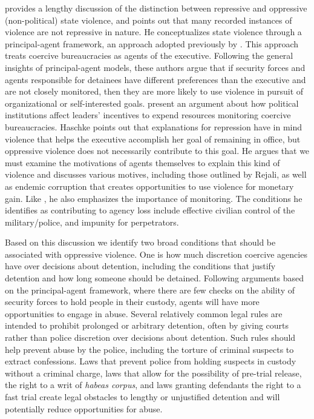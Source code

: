 \documentclass[11pt]{article}
\begin{document}
\citet{Haschke2018} provides a lengthy discussion of the distinction between repressive and oppressive (non-political) state violence, and points out that many recorded instances of violence are not repressive in nature. He conceptualizes state violence through a principal-agent framework, an approach adopted previously by \citet{ConradMoore2010}. This approach treats coercive bureaucracies as agents of the executive. Following the general insights of principal-agent models, these authors argue that if security forces and agents responsible for detainees have different preferences than the executive and are not closely monitored, then they are more likely to use violence in pursuit of organizational or self-interested goals. \citet{ConradMoore2010} present an argument about how political institutions affect leaders' incentives to expend resources monitoring coercive bureaucracies. Haschke points out that explanations for repression have in mind violence that helps the executive accomplish her goal of remaining in office, but oppressive violence does not necessarily contribute to this goal. He argues that we must examine the motivations of agents themselves to explain this kind of violence and discusses various motives, including those outlined by Rejali, as well as endemic corruption that creates opportunities to use violence for monetary gain. Like \citet{ConradMoore2010}, he also emphasizes the importance of monitoring. The conditions he identifies as contributing to agency loss include effective civilian control of the military/police, and impunity for perpetrators. 

Based on this discussion we identify two broad conditions that should be associated with oppressive violence. One is how much discretion coercive agencies have over decisions about detention, including the conditions that justify detention and how long someone should be detained. Following arguments based on the principal-agent framework, where there are few checks on the ability of security forces to hold people in their custody, agents will have more opportunities to engage in abuse. Several relatively common legal rules are intended to prohibit prolonged or arbitrary detention, often by giving courts rather than police discretion over decisions about detention. Such rules should help prevent abuse by the police, including the torture of criminal suspects to extract confessions. Laws that prevent police from holding suspects in custody without a criminal charge, laws that allow for the possibility of pre-trial release, the right to a writ of {\em habeas corpus}, and laws granting defendants the right to a fast trial create legal obstacles to lengthy or unjustified detention and will potentially reduce opportunities for abuse. 
\end{document}
